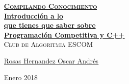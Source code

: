 \documentclass[12pt, fleqn]{report}                             %
\author{Oscar Andrés Rosas}                                     %
\theoremstyle{break}                                            %
\begin{document}
\begin{titlepage}
    
    \pagecolor{TitlePageColor}                                      %
    \color{white}                                                   %
    \newcommand{\Github}{https://compilandoconocimiento.github.io/Reference/} %

    \vspace                                                         %
    \baselineskip                                                   %

    \makebox[0pt][l]{\rule{1.3\textwidth}{3pt}}                     %
    
    \href{\Github}                                                  %
    {\textbf{\textsc{\Huge Compilando Conocimiento}}}\\[2.7cm]      %

    \href{\Github/LibroAnalisisVectorial}                           %
    {\fontsize{35}{46}\selectfont                                   %
        \textbf{Introducción a lo\\[0.6cm] 
        que tienes que saber sobre \\[0.4cm]
        Programación Competitiva y C++}}\\[0.5cm]  %
    \textcolor{ColorSubtext}{\textsc{\Huge Club de Algoritmia ESCOM}}%
    
    \vfill                                                          %
    
    \href{https://SoyOscarRH.github.io}                            %
    {\LARGE \textsf{Rosas Hernandez Oscar Andrés}}                 %


    \vspace                                                         %
    \baselineskip                                                   %
    
    {\large \textsf{Enero 2018}}                                    %

\end{titlepage}
\end{document}
